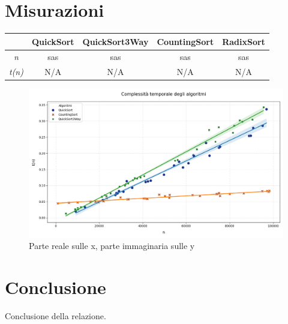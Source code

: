 \documentclass[a4paper, 11pt]{article}
\begin{document}
\section{Misurazioni}

\begin{table} [H]
    \centering
    \begin{tabular}{|c||c|c|c|c|}
        \hline
        & \textbf{QuickSort} & \textbf{QuickSort3Way} & \textbf{CountingSort} & \textbf{RadixSort}\\ [0.1 cm]
        \hline
        \textit{n} & sas & sas & sas & sas\\
        \hline
        \textit{t(n)} & N/A & N/A & N/A & N/A\\
        \hline
    \end{tabular}
\end{table}

\begin{figure} [H]
    \centering
    \includegraphics[scale=0.5]{Immagini/Grafico.png}
    \caption*{Parte reale sulle x, parte immaginaria sulle y}
\end{figure}

\section{Conclusione}
Conclusione della relazione.
\end{document}
